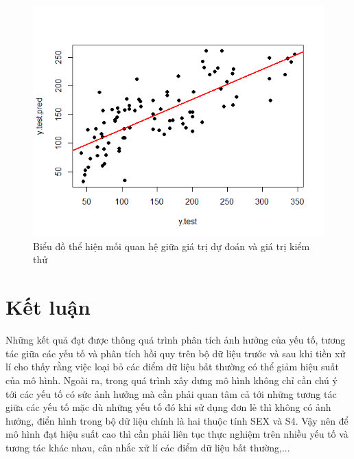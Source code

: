 \documentclass[runningheads]{llncs}
\begin{document}
\begin{figure}[H]
\centering
\includegraphics[width=\textwidth]{Rplot}
\caption{Biểu đồ thể hiện mối quan hệ giữa giá trị dự đoán và giá trị kiểm thử} \label{fig2}
\end{figure}

\section{Kết luận}
 Những kết quả đạt được thông quá trình phân tích ảnh hưởng của yếu tố, tương tác giữa các yếu tố và phân tích hồi quy trên bộ dữ liệu trước và sau khi tiền xử lí cho thấy rằng việc loại bỏ các điểm dữ liệu bất thường có thể giảm hiệu suất của mô hình. Ngoài ra, trong quá trình xây dưng mô hình không chỉ cần chú ý tới các yếu tố có sức ảnh hưởng mà cần phải quan tâm cả tới những tương tác giữa các yếu tố mặc dù những yếu tố đó khi sử dụng đơn lẻ thì không có ảnh hưởng, điển hình trong bộ dữ liệu chính là hai thuộc tính SEX và S4. Vậy nên để mô hình đạt hiệu suất cao thì cần phải liên tục thực nghiệm trên nhiều yếu tố và tương tác khác nhau, cân nhắc xử lí các điểm dữ liệu bất thường,...

\begin{thebibliography}{5}

\end{thebibliography}
\end{document}

